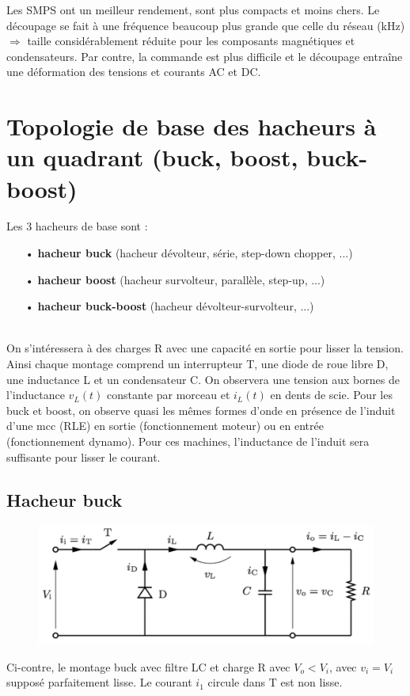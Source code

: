 		Les SMPS ont un meilleur rendement, sont plus compacts et moins chers. Le découpage se fait à une fréquence beaucoup plus grande que celle du réseau (kHz) $\Rightarrow$ taille considérablement réduite pour les composants magnétiques et condensateurs. Par contre, la commande est plus difficile et le découpage entraîne une déformation des tensions et courants AC et DC. 
		
\section{Topologie de base des hacheurs à un quadrant (buck, boost, buck-boost)}
	Les 3 hacheurs de base sont :
	\begin{itemize}
		\item[•] \textbf{hacheur buck} (hacheur dévolteur, série, step-down chopper, ...) 
		\item[•] \textbf{hacheur boost} (hacheur survolteur, parallèle, step-up, ...)
		\item[•] \textbf{hacheur buck-boost} (hacheur dévolteur-survolteur, ...)
	\end{itemize}
	\ \\
	
	On s'intéressera à des charges R avec une capacité en sortie pour lisser la tension. Ainsi chaque montage comprend un interrupteur T, une diode de roue libre D, une inductance L et un condensateur C. On observera une tension aux bornes de l'inductance $v_L(t)$ constante par morceau et $i_L(t)$ en dents de scie. Pour les buck et boost, on observe quasi les mêmes formes d'onde en présence de l'induit d'une mcc (RLE) en sortie (fonctionnement moteur) ou en entrée (fonctionnement dynamo). Pour ces machines, l'inductance de l'induit sera suffisante pour lisser le courant. 
	
	\subsection{Hacheur buck}	
	
		\begin{figure}
		\vspace{-5mm}
		\includegraphics[scale=0.3]{ch5/2}
		\end{figure}	
		Ci-contre, le montage buck avec filtre LC et charge R avec $V_o < V_i$, avec $v_i= V_i$ supposé parfaitement lisse. Le courant $i_1$ circule dans T est non lisse.  
		
